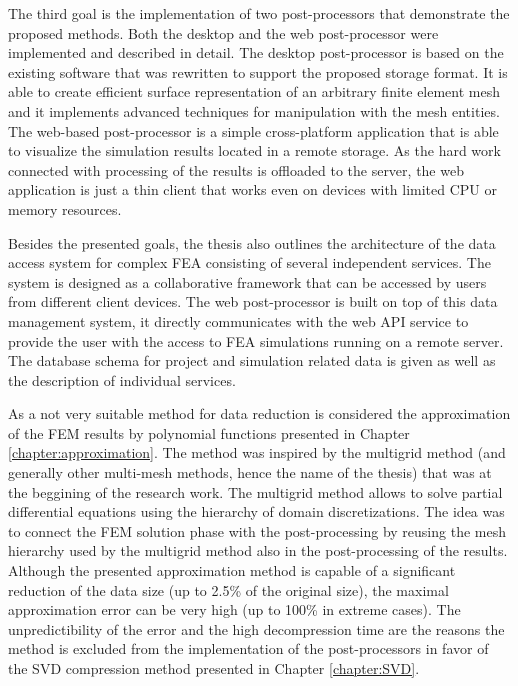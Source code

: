 The third goal is the implementation of two post-processors that demonstrate the proposed methods. Both the desktop and the web post-processor were implemented and described in detail. The desktop post-processor is based on the existing software that was rewritten to support the proposed storage format. It is able to create efficient surface representation of an arbitrary finite element mesh and it implements advanced techniques for manipulation with the mesh entities. The web-based post-processor is a simple cross-platform application that is able to visualize the simulation results located in a remote storage. As the hard work connected with processing of the results is offloaded to the server, the web application is just a thin client that works even on devices with limited CPU or memory resources.

Besides the presented goals, the thesis also outlines the architecture of the data access system for complex FEA consisting of several independent services. The system is designed as a collaborative framework that can be accessed by users from different client devices. The web post-processor is built on top of this data management system, it directly communicates with the web API service to provide the user with the access to FEA simulations running on a remote server. The database schema for project and simulation related data is given as well as the description of individual services.


As a not very suitable method for data reduction is considered the approximation of the FEM results by polynomial functions presented in Chapter \ref{chapter:approximation}. The method was inspired by the multigrid method (and generally other multi-mesh methods, hence the name of the thesis) that was at the beggining of the research work. The multigrid method allows to solve partial differential equations using the hierarchy of domain discretizations. The idea was to connect the FEM solution phase with the post-processing by reusing the mesh hierarchy used by the multigrid method also in the post-processing of the results. Although the presented approximation method is capable of a significant reduction of the data size (up to 2.5\% of the original size), the maximal approximation error can be very high (up to 100\% in extreme cases). The unpredictibility of the error and the high decompression time are the reasons the method is excluded from the implementation of the post-processors in favor of the SVD compression method presented in Chapter \ref{chapter:SVD}.

